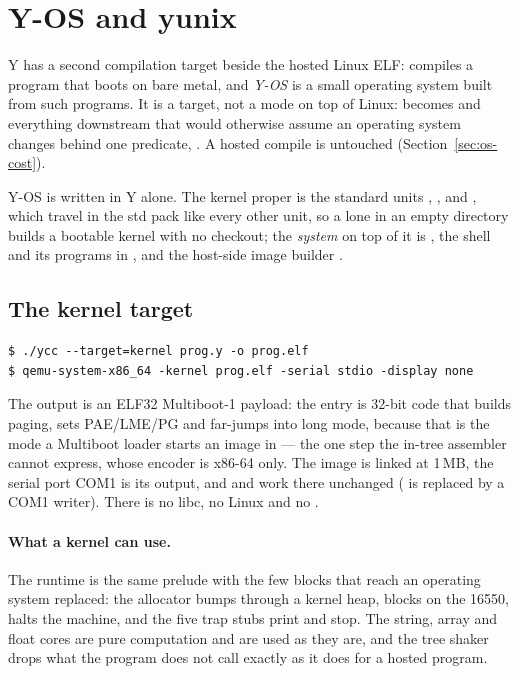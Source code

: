 \section{Y-OS and yunix}
\label{sec:os}

\textsf{Y} has a second compilation target beside the hosted Linux ELF:
 compiles a program that boots on bare metal, and \emph{Y-OS}
is a small operating system built from such programs. It is a target, not a
mode on top of Linux:  becomes  and everything
downstream that would otherwise assume an operating system changes behind one
predicate, . A hosted compile is untouched
(Section~\ref{sec:os-cost}).

Y-OS is written in \textsf{Y} alone. The kernel proper is the standard units
, ,  and , which travel in the std pack
like every other unit, so a lone  in an empty directory
builds a bootable kernel with no checkout; the \emph{system} on top of it is
, the shell and its programs in , and the
host-side image builder .

\subsection{The kernel target}

\begin{lstlisting}
$ ./ycc --target=kernel prog.y -o prog.elf
$ qemu-system-x86_64 -kernel prog.elf -serial stdio -display none
\end{lstlisting}

\noindent The output is an ELF32 Multiboot-1 payload: the entry is 32-bit
code that builds paging, sets PAE/LME/PG and far-jumps into long mode,
because that is the mode a Multiboot loader starts an image in --- the one
step the in-tree assembler cannot express, whose encoder is x86-64 only. The
image is linked at 1\,MB, the serial port COM1 is its output, and 
and  work there unchanged ( is replaced by a COM1
writer). There is no libc, no Linux and no .

\paragraph{What a kernel can use.} The runtime is the same prelude with the
few blocks that reach an operating system replaced: the allocator bumps
through a kernel heap,  blocks on the 16550, 
halts the machine, and the five trap stubs print and stop. The string, array
and float cores are pure computation and are used as they are, and the tree
shaker drops what the program does not call exactly as it does for a hosted
program.

